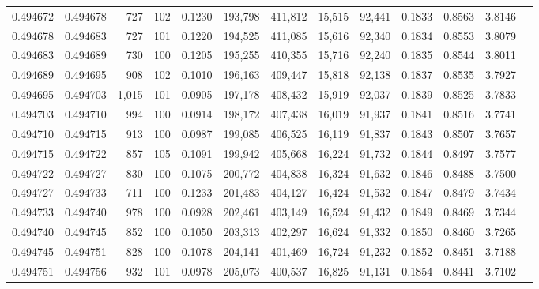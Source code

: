 \begin{tabular}{rrrrrrrrrrrrr}
0.494672 & 0.494678 &   727 & 102 &                                     0.1230 & 193,798 & 411,812 &  15,515 &  92,441 & 0.1833 & 0.8563 & 3.8146 \\
0.494678 & 0.494683 &   727 & 101 &                                     0.1220 & 194,525 & 411,085 &  15,616 &  92,340 & 0.1834 & 0.8553 & 3.8079 \\
0.494683 & 0.494689 &   730 & 100 &                                     0.1205 & 195,255 & 410,355 &  15,716 &  92,240 & 0.1835 & 0.8544 & 3.8011 \\
0.494689 & 0.494695 &   908 & 102 &                                     0.1010 & 196,163 & 409,447 &  15,818 &  92,138 & 0.1837 & 0.8535 & 3.7927 \\
0.494695 & 0.494703 & 1,015 & 101 &                                     0.0905 & 197,178 & 408,432 &  15,919 &  92,037 & 0.1839 & 0.8525 & 3.7833 \\
0.494703 & 0.494710 &   994 & 100 &                                     0.0914 & 198,172 & 407,438 &  16,019 &  91,937 & 0.1841 & 0.8516 & 3.7741 \\
0.494710 & 0.494715 &   913 & 100 &                                     0.0987 & 199,085 & 406,525 &  16,119 &  91,837 & 0.1843 & 0.8507 & 3.7657 \\
0.494715 & 0.494722 &   857 & 105 &                                     0.1091 & 199,942 & 405,668 &  16,224 &  91,732 & 0.1844 & 0.8497 & 3.7577 \\
0.494722 & 0.494727 &   830 & 100 &                                     0.1075 & 200,772 & 404,838 &  16,324 &  91,632 & 0.1846 & 0.8488 & 3.7500 \\
0.494727 & 0.494733 &   711 & 100 &                                     0.1233 & 201,483 & 404,127 &  16,424 &  91,532 & 0.1847 & 0.8479 & 3.7434 \\
0.494733 & 0.494740 &   978 & 100 &                                     0.0928 & 202,461 & 403,149 &  16,524 &  91,432 & 0.1849 & 0.8469 & 3.7344 \\
0.494740 & 0.494745 &   852 & 100 &                                     0.1050 & 203,313 & 402,297 &  16,624 &  91,332 & 0.1850 & 0.8460 & 3.7265 \\
0.494745 & 0.494751 &   828 & 100 &                                     0.1078 & 204,141 & 401,469 &  16,724 &  91,232 & 0.1852 & 0.8451 & 3.7188 \\
0.494751 & 0.494756 &   932 & 101 &                                     0.0978 & 205,073 & 400,537 &  16,825 &  91,131 & 0.1854 & 0.8441 & 3.7102 \\

\end{tabular}
